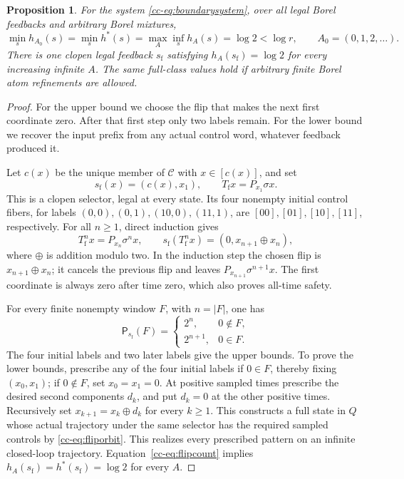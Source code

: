 \documentclass[11pt,reqno]{amsart}
\numberwithin{equation}{section}
\newtheorem{proposition}[theorem]{Proposition}
\theoremstyle{definition}
\theoremstyle{definition}
\newcommand{\Patt}{\mathsf P}
\newcommand{\hpat}{h^{*}}
\begin{document}
\begin{proposition}\label{cc-prop:boundary}
For the system \eqref{cc-eq:boundarysystem}, over all legal Borel feedbacks
and arbitrary Borel mixtures,
\begin{equation}\label{cc-eq:boundaryvalue}
 \min_s h_{A_0}(s)=\min_s\hpat(s)=
 \max_A\inf_s h_A(s)=\log2<\log r,
 \qquad A_0=(0,1,2,\ldots).
\end{equation}
There is one clopen legal feedback $s_{\mathrm f}$ satisfying
$h_A(s_{\mathrm f})=\log2$ for every increasing infinite $A$.
The same full-class values hold if arbitrary finite Borel atom
refinements are allowed.
\end{proposition}
\begin{proof}
For the upper bound we choose the flip that makes the next first
coordinate zero. After that first step only two labels remain. For
the lower bound we recover the input prefix from any actual control
word, whatever feedback produced it.

Let $c(x)$ be the unique member of $\mathcal C$ with $x\in[c(x)]$,
and set
\[
 s_{\mathrm f}(x)=(c(x),x_1),\qquad
 T_{\mathrm f}x=P_{x_1}\sigma x.
\]
This is a clopen selector, legal at every state. Its four nonempty
initial control fibers, for labels $(0,0),(0,1),(10,0),(11,1)$, are
$[00],[01],[10],[11]$, respectively. For all $n\ge1$, direct induction
gives
\begin{equation}\label{cc-eq:fliporbit}
 T_{\mathrm f}^n x=P_{x_n}\sigma^n x,
 \qquad s_{\mathrm f}(T_{\mathrm f}^n x)
        =(0,x_{n+1}\mathbin\oplus x_n),
\end{equation}
where $\oplus$ is addition modulo two. In the induction step the
chosen flip is $x_{n+1}\oplus x_n$; it cancels the previous flip and
leaves $P_{x_{n+1}}\sigma^{n+1}x$. The first coordinate is always zero
after time zero, which also proves all-time safety.

For every finite nonempty window $F$, with $n=|F|$, one has
\begin{equation}\label{cc-eq:flipcount}
 \Patt_{s_{\mathrm f}}(F)=
 \begin{cases}2^n,&0\notin F,\\2^{n+1},&0\in F.\end{cases}
\end{equation}
The four initial labels and two later labels give the upper bounds.
To prove the lower bounds, prescribe any of the four initial labels
if $0\in F$, thereby fixing $(x_0,x_1)$; if $0\notin F$, set
$x_0=x_1=0$. At positive sampled times prescribe the desired second
components $d_k$, and put $d_k=0$ at the other positive times.
Recursively set $x_{k+1}=x_k\oplus d_k$ for every $k\ge1$.
This constructs a full state in $Q$ whose actual trajectory under the
same selector has the required sampled controls by
\eqref{cc-eq:fliporbit}. This realizes every prescribed pattern on
an infinite closed-loop trajectory. Equation~\eqref{cc-eq:flipcount}
implies $h_A(s_{\mathrm f})=\hpat(s_{\mathrm f})=\log2$ for every $A$.


\end{proof}
\end{document}
